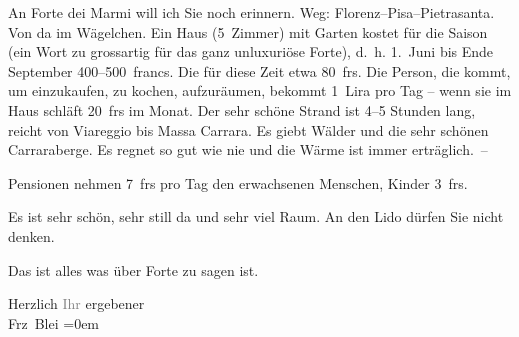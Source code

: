 \pstart
           An Forte dei Marmi will ich Sie noch erinnern.
               Weg: Florenz–Pisa–Pietrasanta. Von da im Wägelchen.
               Ein Haus (5 Zimmer) mit Garten kostet für die Saison (ein Wort zu grossartig für das
               ganz unluxuriöse Forte), d. h.
                  1. Juni bis Ende September 400–500 francs. Die \label{K_L01998-3v}\label{K_L01998-3} für diese Zeit etwa 80 frs.
               Die Person, die kommt, um einzukaufen, zu kochen, aufzuräumen, bekommt 1 Lira pro Tag
               – wenn sie im Haus schläft 20 frs im Monat. {\pb}Der sehr schöne Strand ist 4–5 Stunden
               lang, reicht von Viareggio bis Massa Carrara. Es giebt Wälder und die sehr
               schönen Carraraberge. Es regnet so gut wie nie
               und die Wärme ist immer erträglich. –\pend
           
\pstart
           Pensionen nehmen 7 frs pro Tag den erwachsenen Menschen, Kinder 3 frs.\pend
           
\pstart
           Es ist sehr schön, sehr still da und sehr viel Raum. An den Lido dürfen Sie nicht denken.\pend
           
\pstart
           Das ist alles was über Forte zu sagen ist.\pend
           
\pstart
           Herzlich \textcolor{gray}{Ihr} ergebener{\\[\baselineskip]}\spacefill\mbox{Frz Blei}\pend
           \leftskip=0em{}\endnumbering{}  
      